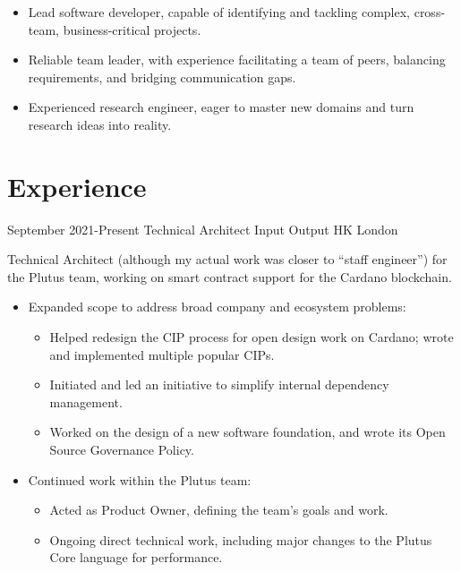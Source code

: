 \documentclass[12pt,a4paper,sans]{moderncv}
\begin{document}
\maketitle

\begin{itemize}
  \item Lead software developer, capable of identifying and tackling complex, cross-team, business-critical projects.
  \item Reliable team leader, with experience facilitating a team of peers, balancing requirements, and bridging communication gaps.
  \item Experienced research engineer, eager to master new domains and turn research ideas into reality.
\end{itemize}

\section{Experience}
\cventry
{September 2021-Present}
{Technical Architect}
{Input Output HK}
{London}
{}
{
  Technical Architect (although my actual work was closer to ``staff engineer'') for the Plutus team, working on smart contract support for the Cardano blockchain.
  \begin{itemize}
    \item Expanded scope to address broad company and ecosystem problems:
    \begin{itemize}
      \item Helped redesign the CIP process for open design work on Cardano; wrote and implemented multiple popular CIPs.
      \item Initiated and led an initiative to simplify internal dependency management.
      \item Worked on the design of a new software foundation, and wrote its Open Source Governance Policy.
    \end{itemize}
    \item Continued work within the Plutus team:
    \begin{itemize}
      \item Acted as Product Owner, defining the team's goals and work.
      \item Ongoing direct technical work, including major changes to the Plutus Core language for performance.
    \end{itemize}
  \end{itemize}
}
\end{document}
